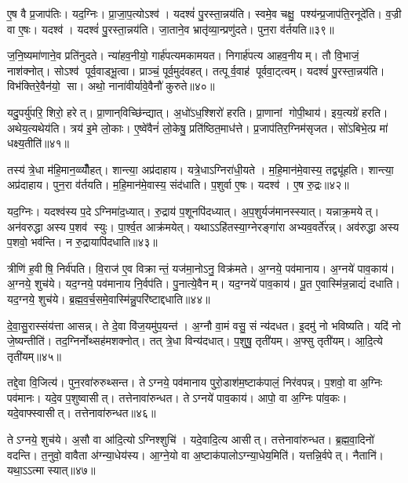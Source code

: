 ए॒ष वै प्र॒जाप॑तिः। यद॒ग्निः। प्रा॒जा॒प॒त्योऽश्व॑। यदश्वं॑ पु॒रस्ता॒न्नय॑ति। स्वमे॒व चक्षु॒ पश्य॑न्प्र॒जाप॑ति॒रनूदे॑ति। व॒ज्री वा ए॒षः। यदश्व॑। यदश्वं॑ पु॒रस्ता॒न्नय॑ति। जा॒ताने॒व भ्रातृ॑व्या॒न्प्रणु॑दते। पुन॒रा व॑र्तयति॥३९॥

ज॒नि॒ष्यमा॑णाने॒व प्रति॑नुदते। न्या॑हव॒नीयो॒ गार्\mbox{}ह॑पत्यमकामयत। निगार्\mbox{}ह॑पत्य आहव॒नीयम्। तौ वि॒भाजं॒ नाश॑क्नोत्। सोऽश्व॑ पूर्व॒वाड्भू॒त्वा। प्राञ्चं॒ पूर्व॒मुद॑वहत्। तत्पूर्व॒वाह॑ पूर्ववा॒ट्त्वम्। यदश्वं॑ पु॒रस्ता॒न्नय॑ति। विभ॑क्तिरे॒वैन॑यो॒ सा। अथो॒ नाना॑वीर्यावे॒वैनौ॑ कुरुते॥४०॥

यदु॒पर्यु॑परि॒ शिरो॒ हरेत्। प्रा॒णान्‌विच्छि॑न्द्यात्। अ॒धो॑ऽध॒श्शिरो॑ हरति। प्रा॒णानां गोपी॒थाय॑। इय॒त्यग्रे॑ हरति। अथेय॒त्यथेय॑ति। त्रय॑ इ॒मे लो॒काः। ए॒ष्वे॑वैनं॑ लो॒केषु॒ प्रति॑ष्ठित॒माध॑त्ते। प्र॒जाप॑तिर॒ग्निम॑सृजत। सो॑ऽबिभे॒त्प्र मा॑ धक्ष्य॒तीति॑॥४१॥

तस्य॑ त्रे॒धा म॑हि॒मान॒व्व्यौँ॑हत्। शान्त्या॒ अप्र॑दाहाय। यत्रे॒धाऽग्निरा॑धी॒यते। म॒हि॒मान॑मे॒वास्य॒ तद्व्यू॑हति। शान्त्या॒ अप्र॑दाहाय। पुन॒रा व॑र्तयति। म॒हि॒मान॑मे॒वास्य॒ संद॑धाति। प॒शुर्वा ए॒षः। यदश्व॑। ए॒ष रु॒द्रः॥४२॥

यद॒ग्निः। यदश्व॑स्य प॒देऽग्निमा॑द॒ध्यात्। रु॒द्राय॑ प॒शूनपि॑दध्यात्। अ॒प॒शुर्यज॑मानस्स्यात्। यन्नाक्र॒मयेत्। अन॑वरुद्धा अस्य प॒शव॑ स्युः। पा॒र्श्व॒त आक्र॑मयेत्। यथाऽऽहि॑तस्या॒ग्नेरङ्गा॑रा अभ्यव॒वर्ते॑रन्न्। अव॑रुद्धा अस्य प॒शवो॒ भव॑न्ति। न रु॒द्रायापि॑दधाति॥४३॥

त्रीणि॑ ह॒वीषि॒ निर्व॑पति। वि॒राज॑ ए॒व विक्रान्तं॒ यज॑मा॒नोऽनु॒ विक्र॑मते। अ॒ग्नये॒ पव॑मानाय। अ॒ग्नये॑ पाव॒काय॑। अ॒ग्नये॒ शुच॑ये। यद॒ग्नये॒ पव॑मानाय नि॒र्वप॑ति। पु॒नात्ये॒वैनम्। यद॒ग्नये॑ पाव॒काय॑। पू॒त ए॒वास्मि॑न्न॒न्नाद्यं॑ दधाति। यद॒ग्नये॒ शुच॑ये। ब्र॒ह्म॒व॒र्च॒समे॒वास्मि॑न्नु॒परि॑ष्टाद्दधाति॥४४॥\anuvakamend[ए॒न॒मा॒ह॒व॒नीयं॑ धत्तेऽश्व॒त्वं व॑र्तयति कुरुत॒ इति॑ रु॒द्रो द॑धाति॒ य॒दग्नये॒ शुच॑य॒ एकं॑ च]

दे॒वा॒सु॒रास्संय॑त्ता आसन्न्। ते दे॒वा वि॑ज॒यमु॑प॒यन्त॑। अ॒ग्नौ वा॒मं वसु॒ सं न्य॑दधत। इ॒दमु॑ नो भविष्यति। यदि॑ नो जे॒ष्यन्तीति॑। तद॒ग्निर्नोथ्सह॑मशक्नोत्। तत् त्रे॒धा विन्य॑दधात्। प॒शुषु॒ तृती॑यम्। अ॒फ्सु तृती॑यम्। आ॒दि॒त्ये तृती॑यम्॥४५॥

तद्दे॒वा वि॒जित्य॑। पुन॒रवा॑रुरुथ्सन्त। तेऽग्नये॒ पव॑मानाय पुरो॒डाश॑म॒ष्टाक॑पालं॒ निर॑वपन्न्। प॒शवो॒ वा अ॒ग्निः पव॑मानः। यदे॒व प॒शुष्वासीत्। तत्तेनावा॑रुन्धत। तेऽग्नये॑ पाव॒काय॑। आपो॒ वा अ॒ग्निः पा॑व॒कः। यदे॒वाफ्स्वासीत्। तत्तेनावा॑रुन्धत॥४६॥

तेऽग्नये॒ शुच॑ये। अ॒सौ वा आ॑दि॒त्योऽग्निश्शुचि॑। यदे॒वादि॒त्य आसीत्। तत्तेनावा॑रुन्धत। ब्र॒ह्म॒वा॒दिनो॑ वदन्ति। त॒नुवो॒ वावैता अ॑ग्न्या॒धेय॑स्य। आ॒ग्ने॒यो वा अ॒ष्टाक॑पालोऽग्न्या॒धेय॒मिति॑। यत्तन्नि॒र्वपेत्। नैतानि॑। यथा॒ऽऽत्मा स्यात्॥४७॥

